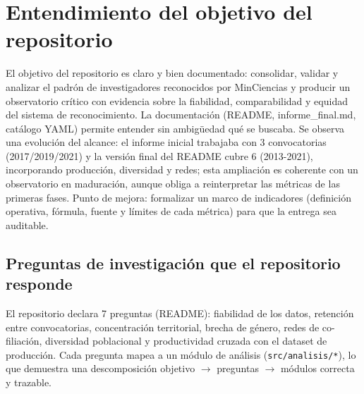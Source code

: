 \section{Entendimiento del objetivo del repositorio}

El objetivo del repositorio es claro y bien documentado: consolidar, validar y analizar el padrón de investigadores reconocidos por MinCiencias y producir un observatorio crítico con evidencia sobre la fiabilidad, comparabilidad y equidad del sistema de reconocimiento. La documentación (README, informe\_final.md, catálogo YAML) permite entender sin ambigüedad qué se buscaba. Se observa una evolución del alcance: el informe inicial trabajaba con 3 convocatorias (2017/2019/2021) y la versión final del README cubre 6 (2013-2021), incorporando producción, diversidad y redes; esta ampliación es coherente con un observatorio en maduración, aunque obliga a reinterpretar las métricas de las primeras fases. Punto de mejora: formalizar un marco de indicadores (definición operativa, fórmula, fuente y límites de cada métrica) para que la entrega sea auditable.


\subsection{Preguntas de investigación que el repositorio responde}

El repositorio declara 7 preguntas (README): fiabilidad de los datos,
retención entre convocatorias, concentración territorial, brecha de género,
redes de co-filiación, diversidad poblacional y productividad cruzada con el
dataset de producción. Cada pregunta mapea a un módulo de análisis
(\texttt{src/analisis/*}), lo que demuestra una descomposición
objetivo $\rightarrow$ preguntas $\rightarrow$ módulos correcta y trazable.
